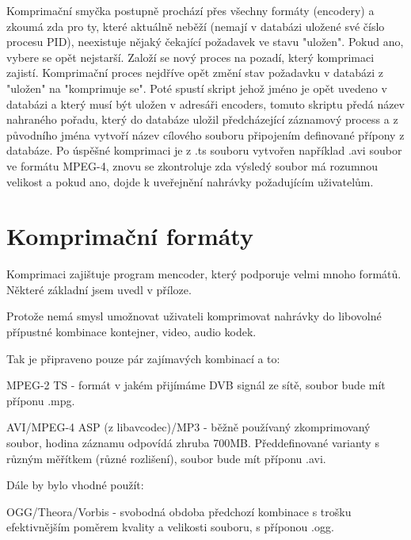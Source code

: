 Komprimační smyčka postupně prochází přes všechny formáty (encodery) a zkoumá zda pro ty, které aktuálně neběží (nemají v databázi uložené své číslo procesu PID), neexistuje nějaký čekající požadavek ve stavu "uložen". Pokud ano, vybere se opět nejstarší. Založí se nový proces na pozadí, který komprimaci zajistí. Komprimační proces nejdříve opět změní stav požadavku v databázi z "uložen" na "komprimuje se". Poté spustí skript jehož jméno je opět uvedeno v databázi a který musí být uložen v adresáři encoders, tomuto skriptu předá název nahraného pořadu, který do databáze uložil předcházející záznamový process a z původního jména vytvoří název cílového souboru připojením definované přípony z databáze. Po úspěšné komprimaci je z .ts souboru vytvořen například .avi soubor ve formátu MPEG-4, znovu se zkontroluje zda výsledý soubor má rozumnou velikost a pokud ano, dojde k uveřejnění nahrávky požadujícím uživatelům. 

\vspace{10pt}

\section{Komprimační formáty}

Komprimaci zajištuje program mencoder, který podporuje velmi mnoho formátů. Některé základní jsem uvedl v příloze.

Protože nemá smysl umožnovat uživateli komprimovat nahrávky do libovolné přípustné kombinace kontejner, video, audio kodek. 

\vspace{10pt}

Tak je připraveno pouze pár zajímavých kombinací a to:

\vspace{10pt}

MPEG-2 TS - formát v jakém přijímáme DVB signál ze sítě, soubor bude mít příponu .mpg.

AVI/MPEG-4 ASP (z libavcodec)/MP3 - běžně používaný zkomprimovaný soubor, hodina záznamu odpovídá zhruba 700MB. Předdefinované varianty s různým měřítkem (různé rozlišení), soubor bude mít příponu .avi.

\vspace{10pt}

Dále by bylo vhodné použít:

\vspace{10pt}

OGG/Theora/Vorbis - svobodná obdoba předchozí kombinace s trošku efektivnějším poměrem kvality a velikosti souboru, s příponou .ogg.

